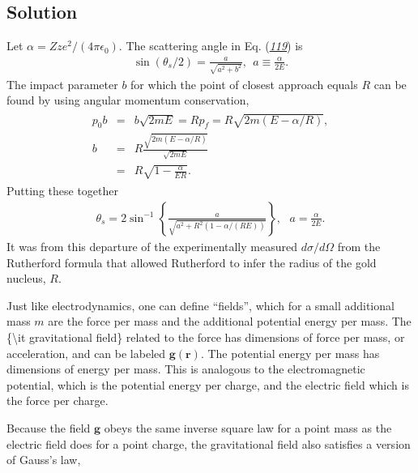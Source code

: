\documentclass[letterpaper,10pt,english]{sphinxmanual}
\begin{document}
\subsection{Solution}
\label{\detokenize{chapter1:id4}}
Let \(\alpha=Zze^2/(4\pi\epsilon_0)\). The scattering angle in Eq. ({\hyperref[\detokenize{chapter1:eq:scattangle}]{\emph{119}}}) is
\begin{equation*}
\begin{split}
\sin(\theta_s/2)=\frac{a}{\sqrt{a^2+b^2}}, ~~a\equiv \frac{\alpha}{2E}.
\end{split}
\end{equation*}
The impact parameter \(b\) for which the point of closest approach
equals \(R\) can be found by using angular momentum conservation,
\begin{equation*}
\begin{split}
\begin{eqnarray*}
p_0b&=&b\sqrt{2mE}=Rp_f=R\sqrt{2m(E-\alpha/R)},\\
b&=&R\frac{\sqrt{2m(E-\alpha/R)}}{\sqrt{2mE}}\\
&=&R\sqrt{1-\frac{\alpha}{ER}}.
\end{eqnarray*}
\end{split}
\end{equation*}
Putting these together
\begin{equation*}
\begin{split}
\theta_s=2\sin^{-1}\left\{
\frac{a}{\sqrt{a^2+R^2(1-\alpha/(RE))}}
\right\},~~~a=\frac{\alpha}{2E}.
\end{split}
\end{equation*}
It was from this departure of the experimentally measured
\(d\sigma/d\Omega\) from the Rutherford formula that allowed Rutherford
to infer the radius of the gold nucleus, \(R\).

Just like electrodynamics, one can define “fields”, which for a small
additional mass \(m\) are the force per mass and the additional
potential energy per mass. The \{\textbackslash{}it gravitational field\} related to
the force has dimensions of force per mass, or acceleration, and can
be labeled \(\boldsymbol{g}(\boldsymbol{r})\). The potential energy per mass has
dimensions of energy per mass. This is analogous to the
electromagnetic potential, which is the potential energy per charge,
and the electric field which is the force per charge.

Because the field \(\boldsymbol{g}\) obeys the same inverse square law for a
point mass as the electric field does for a point charge, the
gravitational field also satisfies a version of Gauss’s law,
\end{document}
